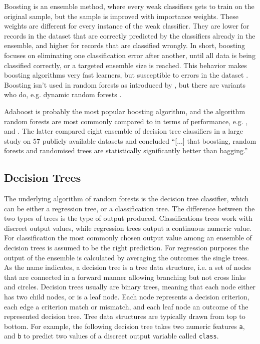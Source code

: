 \documentclass[a4paper,man,12pt,apacite,floatsintext,draftfirst]{apa6} %
\begin{document}
Boosting is an ensemble method, where every weak classifiers gets to train
on the original sample, but the sample is improved with importance weights.
These weights are different for every instance of the weak classifier.
They are lower for records in the dataset that are correctly predicted by
the classifiers already in the ensemble,
and higher for records that are classified wrongly.
In short, boosting focuses on eliminating one classification error after
another, until all data is being classified correctly,
or a targeted ensemble size is reached.
This behavior makes boosting algorithms very fast learners,
but susceptible to errors in the dataset \cite{long2010random}.
Boosting isn't used in random forests as introduced by ,
but there are variants who do, e.g.
dynamic random forests \cite{bernard2012dynamic}.

Adaboost \cite{freund1995decision} is probably the most popular
boosting algorithm, and the algorithm random forests are most commonly
compared to in terms of performance, e.g. ,
 and .
The latter compared eight ensemble of decision tree classifiers in a
large study on 57 publicly available datasets and concluded
“[...] that boosting, random forests and randomised trees are
statistically significantly better than bagging.”

\subsection{Decision Trees}

The underlying algorithm of random forests is the decision tree classifier,
which can be either a regression tree, or a classification tree.
The difference between the two types of trees is the type of output produced.
Classifications trees work with discreet output values,
while regression trees output a continuous numeric value.
For classification the most commonly chosen output value among an ensemble
of decision trees is assumed to be the right prediction.
For regression purposes the output of the ensemble is calculated by averaging
the outcomes the single trees.
As the name indicates, a decision tree is a tree data structure, i.e.
a set of nodes that are connected in a forward manner allowing branching
but not cross links and circles.
Decision trees usually are binary trees, meaning that each node either has
two child nodes, or is a leaf node.
Each node represents a decision criterion, each edge a criterion match or
mismatch, and each leaf node an outcome of the represented decision tree.
Tree data structures are typically drawn from top to bottom.
For example, the following decision tree takes two numeric features
\texttt{a}, and \texttt{b} to predict two values of a discreet output variable
called \texttt{class}.
\end{document}
